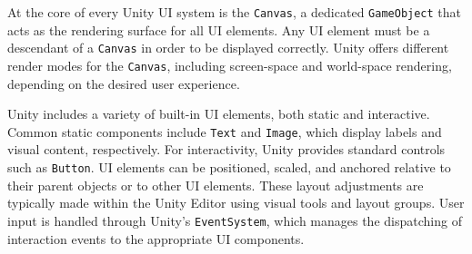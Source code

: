 At the core of every Unity UI system is the \verb|Canvas|, a dedicated \verb|GameObject| that acts as the rendering surface for all UI elements. Any UI element must be a descendant of a \verb|Canvas| in order to be displayed correctly. Unity offers different render modes for the \verb|Canvas|, including screen-space and world-space rendering, depending on the desired user experience.

Unity includes a variety of built-in UI elements, both static and interactive. Common static components include \verb|Text| and \verb|Image|, which display labels and visual content, respectively. For interactivity, Unity provides standard controls such as \verb|Button|. UI elements can be positioned, scaled, and anchored relative to their parent objects or to other UI elements. These layout adjustments are typically made within the Unity Editor using visual tools and layout groups. User input is handled through Unity’s \verb|EventSystem|, which manages the dispatching of interaction events to the appropriate UI components.
